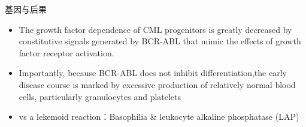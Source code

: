 \documentclass[
  ignorenonframetext,
]{beamer}
\begin{document}
\begin{frame}
\begin{block}{基因与后果}
\protect\hypertarget{ux57faux56e0ux4e0eux540eux679c-1}{}
\begin{itemize}
\item
  The growth factor dependence of CML progenitors is greatly decreased
  by constitutive signals generated by BCR-ABL that mimic the effects of
  growth factor receptor activation.
\item
  Importantly, because BCR-ABL does not inhibit differentiation,the
  early disease course is marked by excessive production of relatively
  normal blood cells, particularly granulocytes and platelets
\item
  vs a lekemoid reaction：Basophilia \& leukocyte alkaline phosphatase
  (LAP)
\end{itemize}
\end{block}
\end{frame}
\end{document}
